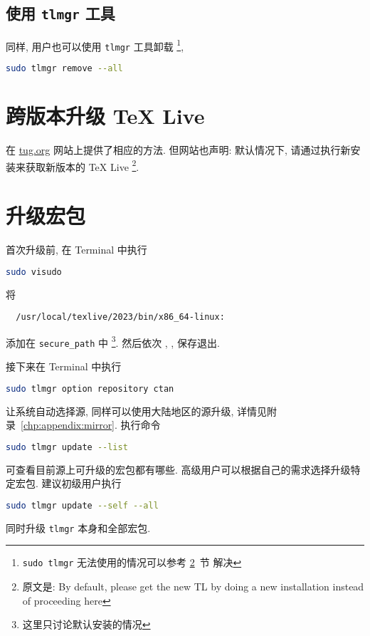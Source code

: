 \subsection{使用 \texttt{tlmgr} 工具}

同样,
用户也可以使用 \texttt{tlmgr} 工具卸载%
\footnote{\texttt{sudo tlmgr} 无法使用的情况可以参考 \ref{sec:ubuntu:update}~节 解决},
\begin{lstlisting}[language=bash]
  sudo tlmgr remove --all
\end{lstlisting}

\section{跨版本升级 \TeX{} Live}\label{sec:ubuntu:version}

在 \href{https://www.tug.org/texlive/upgrade.html}{tug.org}
网站上提供了相应的方法.
但网站也声明:
默认情况下,
请通过执行新安装来获取新版本的 \TeX{} Live%
\footnote{原文是: By default,
please get the new TL by doing a new installation instead of proceeding here}.

\section{升级宏包}\label{sec:ubuntu:update}

首次升级前,
在 \textsf{Terminal} 中执行
\begin{lstlisting}[language = bash]
  sudo visudo
\end{lstlisting}
将
\begin{lstlisting}
  /usr/local/texlive/2023/bin/x86_64-linux:
\end{lstlisting}
添加在 \texttt{secure\_path} 中%
\footnote{这里只讨论默认安装的情况}.
然后依次 , , \keys{\enter} 保存退出.

接下来在 \textsf{Terminal} 中执行
\begin{lstlisting}[language = bash]
  sudo tlmgr option repository ctan
\end{lstlisting}
让系统自动选择源,
同样可以使用大陆地区的源升级,
详情见附录~\ref{chp:appendix:mirror}.
执行命令
\begin{lstlisting}[language = bash]
  sudo tlmgr update --list
\end{lstlisting}
可查看目前源上可升级的宏包都有哪些. 
高级用户可以根据自己的需求选择升级特定宏包.
建议初级用户执行
\begin{lstlisting}[language = bash]
  sudo tlmgr update --self --all
\end{lstlisting}
同时升级 \texttt{tlmgr} 本身和全部宏包. 

